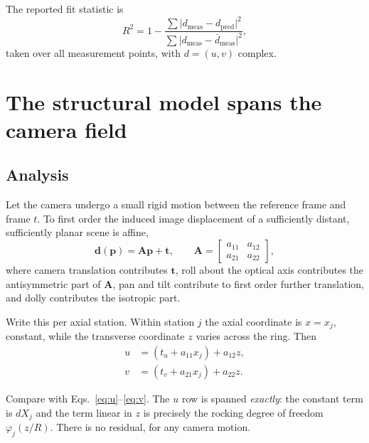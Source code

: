 \documentclass[preprint,12pt]{elsarticle}
\begin{document}
The reported fit statistic is
\begin{equation}
R^2 = 1 - \frac{\sum \lvert d_{\mathrm{meas}}
                 - d_{\mathrm{pred}}\rvert^2}
                {\sum \lvert d_{\mathrm{meas}}
                 - \bar{d}_{\mathrm{meas}}\rvert^2},
\label{eq:r2}
\end{equation}
taken over all measurement points, with $d = (u, v)$ complex.

\section{The structural model spans the camera field}
\label{sec:ident}

\subsection{Analysis}
\label{sec:ident-analysis}

Let the camera undergo a small rigid motion between the reference frame and
frame $t$. To first order the induced image displacement of a sufficiently
distant, sufficiently planar scene is affine,
\begin{equation}
\mathbf{d}(\mathbf{p}) = \mathbf{A}\mathbf{p} + \mathbf{t},
\qquad
\mathbf{A} = \begin{bmatrix} a_{11} & a_{12}\\
                             a_{21} & a_{22}\end{bmatrix},
\label{eq:affine}
\end{equation}
where camera translation contributes $\mathbf{t}$, roll about the optical
axis contributes the antisymmetric part of $\mathbf{A}$, pan and tilt
contribute to first order further translation, and dolly contributes the
isotropic part.

Write this per axial station. Within station $j$ the axial coordinate is
$x = x_j$, constant, while the transverse coordinate $z$ varies across the
ring. Then
\begin{align}
u &= (t_u + a_{11}x_j) + a_{12}z, \label{eq:cam-u}\\
v &= (t_v + a_{21}x_j) + a_{22}z. \label{eq:cam-v}
\end{align}

Compare with Eqs.~\eqref{eq:u}--\eqref{eq:v}. The $u$ row is spanned
\emph{exactly}: the constant term is $dX_j$ and the term linear in $z$ is
precisely the rocking degree of freedom $\varphi_j (z/R)$. There is no
residual, for any camera motion.
\end{document}
